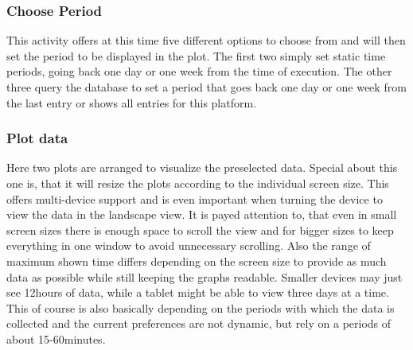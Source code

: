 \documentclass[11pt,oneside,a4paper]{scrartcl}
\begin{document}
\subsubsection{Choose Period}
This activity offers at this time five different options to choose from and will then set the period to be displayed in the plot. The first two simply set static time periods, going back one day or one week from the time of execution.
The other three query the database to set a period that goes back one day or one week from the last entry or shows all entries for this platform.

\subsubsection{Plot data}
Here two plots are arranged to visualize the preselected data. Special about this one is, that it will resize the plots according to the individual screen size. This offers multi-device support and is even important when turning the device to view the data in the landscape view. It is payed attention to, that even in small screen sizes there is enough space to scroll the view and for bigger sizes to keep everything in one window to avoid unnecessary scrolling. Also the range of maximum shown time differs depending on the screen size to provide as much data as possible while still keeping the graphs readable. Smaller devices may just see 12hours of data, while a tablet might be able to view three days at a time.
This of course is also basically depending on the periods with which the data is collected and the current preferences are not dynamic, but rely on a periods of about 15-60minutes. 
\end{document}
